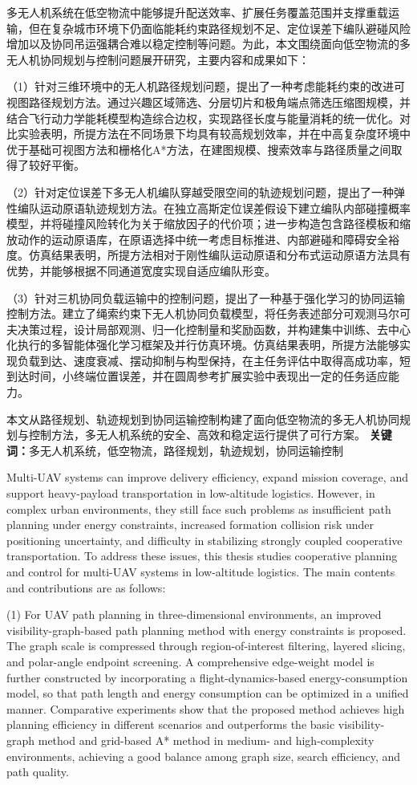 多无人机系统在低空物流中能够提升配送效率、扩展任务覆盖范围并支撑重载运输，但在复杂城市环境下仍面临能耗约束路径规划不足、定位误差下编队避碰风险增加以及协同吊运强耦合难以稳定控制等问题。为此，本文围绕面向低空物流的多无人机协同规划与控制问题展开研究，主要内容和成果如下：

（1）针对三维环境中的无人机路径规划问题，提出了一种考虑能耗约束的改进可视图路径规划方法。通过兴趣区域筛选、分层切片和极角端点筛选压缩图规模，并结合飞行动力学能耗模型构造综合边权，实现路径长度与能量消耗的统一优化。对比实验表明，所提方法在不同场景下均具有较高规划效率，并在中高复杂度环境中优于基础可视图方法和栅格化A*方法，在建图规模、搜索效率与路径质量之间取得了较好平衡。

（2）针对定位误差下多无人机编队穿越受限空间的轨迹规划问题，提出了一种弹性编队运动原语轨迹规划方法。在独立高斯定位误差假设下建立编队内部碰撞概率模型，并将碰撞风险转化为关于缩放因子的代价项；进一步构造包含路径模板和缩放动作的运动原语库，在原语选择中统一考虑目标推进、内部避碰和障碍安全裕度。仿真结果表明，所提方法相对于刚性编队运动原语和分布式运动原语方法具有优势，并能够根据不同通道宽度实现自适应编队形变。

（3）针对三机协同负载运输中的控制问题，提出了一种基于强化学习的协同运输控制方法。建立了绳索约束下无人机协同负载模型，将任务表述部分可观测马尔可夫决策过程，设计局部观测、归一化控制量和奖励函数，并构建集中训练、去中心化执行的多智能体强化学习框架及并行仿真环境。仿真结果表明，所提方法能够实现负载到达、速度衰减、摆动抑制与构型保持，在主任务评估中取得高成功率，短到达时间，小终端位置误差，并在圆周参考扩展实验中表现出一定的任务适应能力。

本文从路径规划、轨迹规划到协同运输控制构建了面向低空物流的多无人机协同规划与控制方法，多无人机系统的安全、高效和稳定运行提供了可行方案。
\noindent\textbf{关键词：}多无人机系统，低空物流，路径规划，轨迹规划，协同运输控制

Multi-UAV systems can improve delivery efficiency, expand mission coverage, and support heavy-payload transportation in low-altitude logistics. However, in complex urban environments, they still face such problems as insufficient path planning under energy constraints, increased formation collision risk under positioning uncertainty, and difficulty in stabilizing strongly coupled cooperative transportation. To address these issues, this thesis studies cooperative planning and control for multi-UAV systems in low-altitude logistics. The main contents and contributions are as follows:

(1) For UAV path planning in three-dimensional environments, an improved visibility-graph-based path planning method with energy constraints is proposed. The graph scale is compressed through region-of-interest filtering, layered slicing, and polar-angle endpoint screening. A comprehensive edge-weight model is further constructed by incorporating a flight-dynamics-based energy-consumption model, so that path length and energy consumption can be optimized in a unified manner. Comparative experiments show that the proposed method achieves high planning efficiency in different scenarios and outperforms the basic visibility-graph method and grid-based A* method in medium- and high-complexity environments, achieving a good balance among graph size, search efficiency, and path quality.

